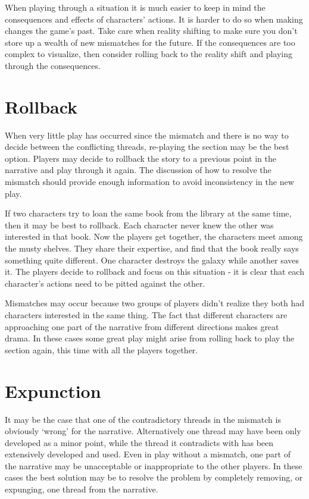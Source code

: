 \documentclass[twoside]{book}
\begin{document}
When playing through a situation it is much easier to keep in mind the
consequences and effects of characters' actions. It is harder to do so
when making changes the game's past. Take care when reality shifting
to make sure you don't store up a wealth of new mismatches for the
future. If the consequences are too complex to visualize, then
consider rolling back to the reality shift and playing through the
consequences.

\section{Rollback}

When very little play has occurred since the mismatch and there is no
way to decide between the conflicting threads, re-playing the section
may be the best option. Players may decide to rollback the story to a
previous point in the narrative and play through it again. The
discussion of how to resolve the mismatch should provide enough
information to avoid inconsistency in the new play.

If two characters try to loan the same book from the library at the
same time, then it may be best to rollback. Each character never knew
the other was interested in that book. Now the players get together,
the characters meet among the musty shelves. They share their
expertise, and find that the book really says something quite
different. One character destroys the galaxy while another saves
it. The players decide to rollback and focus on this situation - it is
clear that each character's actions need to be pitted against the
other.

Mismatches may occur because two groups of players didn't realize they
both had characters interested in the same thing. The fact that
different characters are approaching one part of the narrative from
different directions makes great drama. In these cases some great play
might arise from rolling back to play the section again, this time
with all the players together.

\section{Expunction}

It may be the case that one of the contradictory threads in the
mismatch is obviously `wrong' for the narrative. Alternatively one
thread may have been only developed as a minor point, while the thread
it contradicts with has been extensively developed and used. Even in
play without a mismatch, one part of the narrative may be unacceptable
or inappropriate to the other players. In these cases the best
solution may be to resolve the problem by completely removing, or
expunging, one thread from the narrative.
\end{document}
